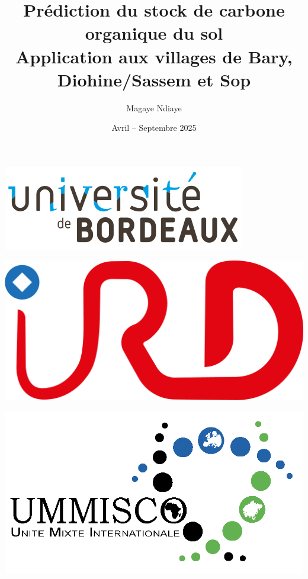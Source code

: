 \documentclass[12pt,a4paper,oneside]{report}
\title{\textbf{Prédiction du stock de carbone organique du sol}\\
\large Application aux villages de Bary, Diohine/Sassem et Sop}
\author{Magaye Ndiaye}
\date{Avril -- Septembre 2025}
\begin{document}
\begin{titlepage}
\begin{center}

\begin{minipage}{0.3\textwidth}
  \includegraphics[width=\linewidth]{images/university-of-bordeaux_logo.png}
\end{minipage}
\hfill
\begin{minipage}{0.3\textwidth}
  \centering
  \includegraphics[width=0.8\linewidth]{images/logo_ird.png}
\end{minipage}
\hfill
\begin{minipage}{0.3\textwidth}
  \raggedleft
  \includegraphics[width=\linewidth]{images/logo_ummisco.png}
\end{minipage}


\end{center}
\end{titlepage}
\end{document}
